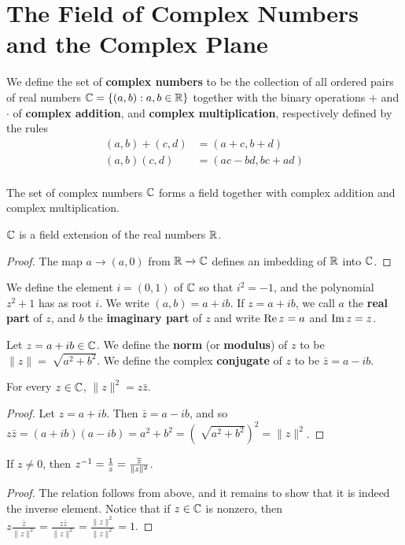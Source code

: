 \section{The Field of Complex Numbers and the Complex Plane}

\begin{definition}
    We define the set of \textbf{complex numbers} to be the collection of all
    ordered pairs of real numbers $\mathbb{C}=\{(a,b) : a,b \in \mathbb{R}\}$ together with the
    binary operations $+$ and  $\cdot$ of  \textbf{complex addition}, and
    \textbf{complex multiplication}, respectively defined by the rules
    \begin{align*}
        (a,b)+(c,d) &=  (a+c,b+d)   \\
        (a,b)(c,d)  &=  (ac-bd,bc+ad)   \\
    \end{align*}
\end{definition}

\begin{theorem}\label{1.1.1}
    The set of complex numbers $\mathbb{C}$ forms a field together with complex addition
    and complex multiplication.
\end{theorem}
\begin{corollary}
    $\mathbb{C}$ is a field extension of the real numbers $\mathbb{R}$.
\end{corollary}
\begin{proof}
    The map $a \xrightarrow{} (a,0)$ from $\mathbb{R} \xrightarrow{} \mathbb{C}$ defines an
    imbedding of $\mathbb{R}$ into  $\mathbb{C}$.
\end{proof}

\begin{definition}
    We define the element $i=(0,1)$ of $\mathbb{C}$ so that  $i^2=-1$, and the
    polynomial $z^2+1$ has as root $i$. We write $(a,b)=a+ib$. If $z=a+ib$, we
    call  $a$ the  \textbf{real part} of $z$, and  $b$ the  \textbf{imaginary
    part} of $z$ and write  $\operatorname{Re}{z}=a$ and $\operatorname{Im}{z}=z$.
\end{definition}

\begin{definition}
    Let $z=a+ib \in \mathbb{C}$. We define the \textbf{norm} (or \textbf{modulus}) of
    $z$ to be  $\|z\|=\sqrt[]{a^2+b^2}$. We define the complex
    \textbf{conjugate} of $z$ to be  $\bar{z}=a-ib$.
\end{definition}

\begin{lemma}\label{1.1.2}
    For every $z \in \mathbb{C}$,  $\|z\|^2=z\bar{z}$.
\end{lemma}
\begin{proof}
    Let $z=a+ib$. Then $\bar{z}=a-ib$, and so
    $z\bar{z}=(a+ib)(a-ib)=a^2+b^2=(\sqrt[]{a^2+b^2})^2=\|z\|^2$.
\end{proof}
\begin{corollary}
    If $z \neq 0$, then $z^{-1}=\frac{1}{z}=\frac{\overline{z}}{\|z\|^2}$.
\end{corollary}
\begin{proof}
    The relation follows from above, and it remains to show that it is indeed
    the inverse element. Notice that if $z \in \mathbb{C}$ is nonzero, then
    $z\frac{\bar{z}}{\|z\|^2}=\frac{z\bar{z}}{\|z\|^2}=\frac{\|z\|^2}{\|z\|^2}=1$.
\end{proof}

